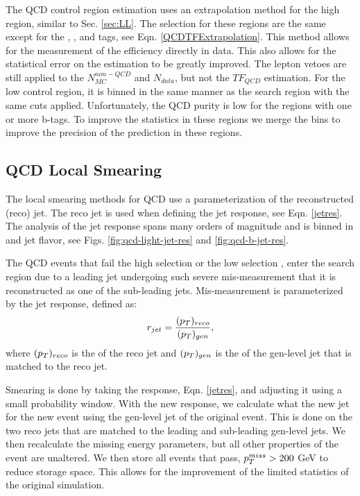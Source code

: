The QCD control region estimation uses an extrapolation method for the high \dm{} region, similar to Sec. \ref{sec:LL}. The selection for these regions are the same except for the \nt, \nrt, and \nw{} tags, see Eqn. \ref{QCDTFExtrapolation}. This method allows for the measurement of the efficiency directly in data. This also allows for the statistical error on the estimation to be greatly improved. The lepton vetoes are still applied to the $N_{MC}^{non-QCD}$ and $N_{data}$, but not the $TF_{QCD}$ estimation. For the low \dm{} control region, it is binned in the same manner as the search region with the same cuts applied. Unfortunately, the QCD purity is low for the regions with one or more b-tags. To improve the statistics in these regions we merge the \met{} bins to improve the precision of the prediction in these regions. 

\subsection{QCD Local Smearing}\label{Smearing}

The local smearing methods for QCD use a parameterization of the reconstructed (reco) jet. The reco jet is used when defining the jet response, see Eqn. \ref{jetres}. The analysis of the jet response spans many orders of magnitude and is binned in \pt{} and jet flavor, see Figs. \ref{fig:qcd-light-jet-res} and \ref{fig:qcd-b-jet-res}. 

The QCD events that fail the high \dm{} selection \highdm{} or the low \dm{} selection \lowdm, enter the search region due to a leading jet undergoing such severe mis-measurement that it is reconstructed as one of the sub-leading jets. Mis-measurement is parameterized by the jet response, defined as:
\begin{equation}\label{jetres}
r_{jet}=\frac{(p_{T})_{reco}}{(p_{T})_{gen}},
\end{equation}
where $(p_{T})_{reco}$ is the \pt{} of the reco jet and $(p_{T})_{gen}$ is the \pt{} of the gen-level jet that is matched to the reco jet.

Smearing is done by taking the response, Eqn. \ref{jetres}, and adjusting it using a small probability window. With the new response, we calculate what the new jet \pt{} for the new event using the gen-level jet \pt{} of the original event. This is done on the two reco jets that are matched to the leading and sub-leading gen-level jets. We then recalculate the missing energy parameters, but all other properties of the event are unaltered. We then store all events that pass, $p_{T}^{miss}>200$ GeV to reduce storage space. This allows for the improvement of the limited statistics of the original simulation. 

